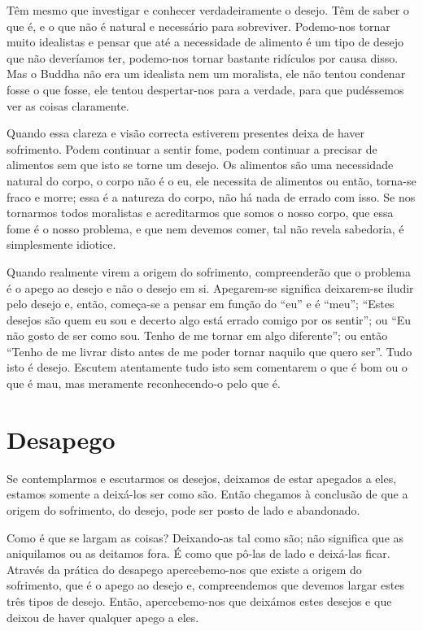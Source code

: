 Têm mesmo que investigar e conhecer verdadeiramente o desejo. Têm de saber o que
é, e o que não é natural e necessário para sobreviver. Podemo-nos tornar muito
idealistas e pensar que até a necessidade de alimento é um tipo de desejo que
não deveríamos ter, podemo-nos tornar bastante ridículos por causa disso. Mas o
Buddha não era um idealista nem um moralista, ele não tentou condenar fosse o
que fosse, ele tentou despertar-nos para a verdade, para que pudéssemos ver as
coisas claramente.

Quando essa clareza e visão correcta estiverem presentes deixa de haver
sofrimento. Podem continuar a sentir fome, podem continuar a precisar de
alimentos sem que isto se torne um desejo. Os alimentos são uma necessidade
natural do corpo, o corpo não é o eu, ele necessita de alimentos ou então,
torna-se fraco e morre; essa é a natureza do corpo, não há nada de errado com
isso. Se nos tornarmos todos moralistas e acreditarmos que somos o nosso corpo,
que essa fome é o nosso problema, e que nem devemos comer, tal não revela
sabedoria, é simplesmente idiotice.

Quando realmente virem a origem do sofrimento, compreenderão que o problema é o
apego ao desejo e não o desejo em si. Apegarem-se significa deixarem-se iludir
pelo desejo e, então, começa-se a pensar em função do “eu” e é “meu”; “Estes
desejos são quem eu sou e decerto algo está errado comigo por os sentir”; ou “Eu
não gosto de ser como sou. Tenho de me tornar em algo diferente”; ou então
“Tenho de me livrar disto antes de me poder tornar naquilo que quero ser”. Tudo
isto é desejo. Escutem atentamente tudo isto sem comentarem o que é bom ou o que
é mau, mas meramente reconhecendo-o pelo que é.

\section{Desapego}

Se contemplarmos e escutarmos os desejos, deixamos de estar apegados a eles,
estamos somente a deixá-los ser como são. Então chegamos à conclusão de que a
origem do sofrimento, do desejo, pode ser posto de lado e abandonado.

Como é que se largam as coisas? Deixando-as tal como são; não significa que as
aniquilamos ou as deitamos fora. É como que pô-las de lado e deixá-las ficar.
Através da prática do desapego apercebemo-nos que existe a origem do sofrimento,
que é o apego ao desejo e, compreendemos que devemos largar estes três tipos de
desejo. Então, apercebemo-nos que deixámos estes desejos e que deixou de haver
qualquer apego a eles.

